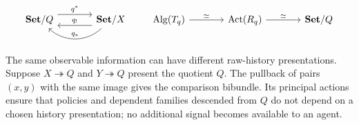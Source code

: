\documentclass[11pt,a4paper]{article}
\numberwithin{equation}{section}
\theoremstyle{definition}
\theoremstyle{remark}
\theoremstyle{plain}
\begin{document}
\[
\begin{tikzcd}[column sep=large]
 \mathbf{Set}/Q\arrow[r,shift left=1.3ex,"q^*"]&
 \mathbf{Set}/X\arrow[l,shift left=1.3ex,"q_!",swap]
 \arrow[l,bend left=42,"q_*"']
\end{tikzcd}
\qquad
\begin{tikzcd}[column sep=large]
 \operatorname{Alg}(T_q)\arrow[r,"\simeq"]&
 \operatorname{Act}(R_q)\arrow[r,"\simeq"]&\mathbf{Set}/Q
\end{tikzcd}
\]

The same observable information can have different raw-history
presentations. Suppose $X\twoheadrightarrow Q$ and
$Y\twoheadrightarrow Q$ present the quotient $Q$. The pullback of
pairs $(x,y)$ with the same image gives the comparison bibundle. Its
principal actions ensure that policies and dependent families descended
from $Q$ do not depend on a chosen history presentation; no additional
signal becomes available to an agent.
\end{document}
